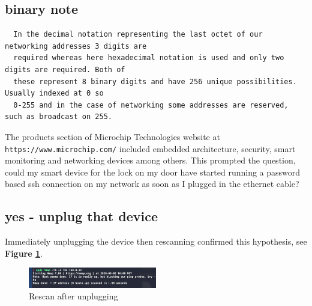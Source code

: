 \documentclass[10pt]{article}
\begin{document}
\subsection*{binary note}
\begin{verbatim}
  In the decimal notation representing the last octet of our networking addresses 3 digits are 
  required whereas here hexadecimal notation is used and only two digits are required. Both of 
  these represent 8 binary digits and have 256 unique possibilities. Usually indexed at 0 so 
  0-255 and in the case of networking some addresses are reserved, such as broadcast on 255.
\end{verbatim}

The products section of Microchip Technologies website at \verb|https://www.microchip.com/| included embedded architecture,
security, smart monitoring and networking devices among others.\cite{microchip} This prompted the question, could my smart device
for the lock on my door have started running a password based ssh connection on my network as soon as I plugged in the 
ethernet cable?

\subsection*{yes - unplug that device}
Immediately unplugging the device then rescanning confirmed this hypothesis, see \textbf{Figure \ref{down image}}.

\begin{figure}[H]
\centering
\includegraphics[width=0.5\textwidth]{down.png}
\caption{Rescan after unplugging}\label{down image}
\end{figure}
\end{document}
